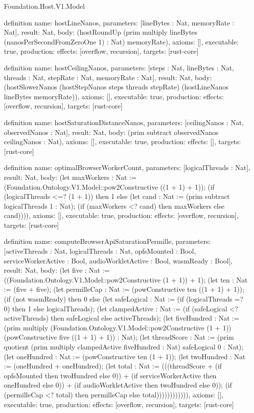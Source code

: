 \begin{lexlean}{Foundation.Host.V1.Model}
\begin{semanticmodule}
definition{
  name: hostLineNanos,
  parameters: [lineBytes : Nat, memoryRate : Nat],
  result: Nat,
  body: (hostRoundUp (prim multiply lineBytes (nanosPerSecondFromZeroOne 1) : Nat) memoryRate),
  axioms: [],
  executable: true,
  production: {effects: [overflow, recursion], targets: [rust-core]}
}

definition{
  name: hostCeilingNanos,
  parameters: [steps : Nat, lineBytes : Nat, threads : Nat, stepRate : Nat, memoryRate : Nat],
  result: Nat,
  body: (hostSlowerNanos (hostStepNanos steps threads stepRate) (hostLineNanos lineBytes memoryRate)),
  axioms: [],
  executable: true,
  production: {effects: [overflow, recursion], targets: [rust-core]}
}

definition{
  name: hostSaturationDistanceNanos,
  parameters: [ceilingNanos : Nat, observedNanos : Nat],
  result: Nat,
  body: (prim subtract observedNanos ceilingNanos : Nat),
  axioms: [],
  executable: true,
  production: {effects: [], targets: [rust-core]}
}

definition{
  name: optimalBrowserWorkerCount,
  parameters: [logicalThreads : Nat],
  result: Nat,
  body: (let maxWorkers : Nat := (Foundation.Ontology.V1.Model::pow2Constructive ((1 + 1) + 1)); (if (logicalThreads <=? (1 + 1)) then 1 else (let cand : Nat := (prim subtract logicalThreads 1 : Nat); (if (maxWorkers <? cand) then maxWorkers else cand)))),
  axioms: [],
  executable: true,
  production: {effects: [overflow, recursion], targets: [rust-core]}
}

definition{
  name: computeBrowserApiSaturationPermille,
  parameters: [activeThreads : Nat, logicalThreads : Nat, opfsMounted : Bool, serviceWorkerActive : Bool, audioWorkletActive : Bool, wasmReady : Bool],
  result: Nat,
  body: (let five : Nat := ((Foundation.Ontology.V1.Model::pow2Constructive (1 + 1)) + 1); (let ten : Nat := (five + five); (let permilleCap : Nat := (powConstructive ten ((1 + 1) + 1)); (if (not wasmReady) then 0 else (let safeLogical : Nat := (if (logicalThreads =? 0) then 1 else logicalThreads); (let clampedActive : Nat := (if (safeLogical <? activeThreads) then safeLogical else activeThreads); (let fiveHundred : Nat := (prim multiply (Foundation.Ontology.V1.Model::pow2Constructive (1 + 1)) (powConstructive five ((1 + 1) + 1)) : Nat); (let threadScore : Nat := (prim quotient (prim multiply clampedActive fiveHundred : Nat) safeLogical 0 : Nat); (let oneHundred : Nat := (powConstructive ten (1 + 1)); (let twoHundred : Nat := (oneHundred + oneHundred); (let total : Nat := (((threadScore + (if opfsMounted then twoHundred else 0)) + (if serviceWorkerActive then oneHundred else 0)) + (if audioWorkletActive then twoHundred else 0)); (if (permilleCap <? total) then permilleCap else total)))))))))))),
  axioms: [],
  executable: true,
  production: {effects: [overflow, recursion], targets: [rust-core]}
}


\end{semanticmodule}
\end{lexlean}
